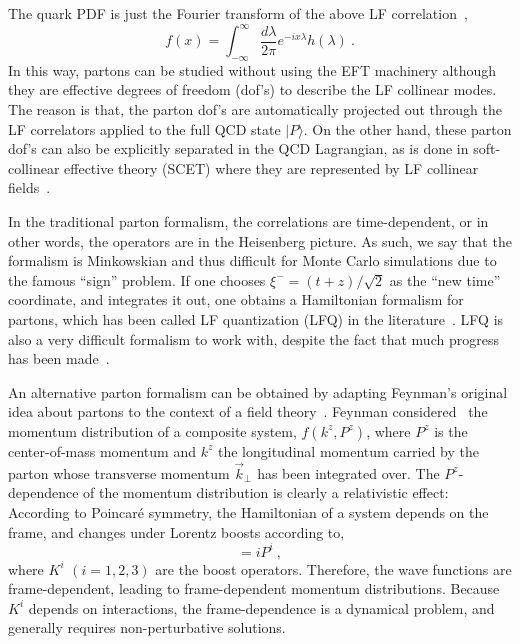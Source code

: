 \documentclass[preprint,12pt]{elsarticle}
\begin{document}
The quark PDF is just the Fourier transform of the above LF correlation~\cite{Collins:2011zzd},
\begin{equation}
     f(x) =\int^\infty_{-\infty} \frac{d\lambda}{2\pi} e^{-ix\lambda}h(\lambda)  \ .
\end{equation}
In this way, partons can be studied without using the EFT machinery although they are effective degrees of freedom (dof's)
to describe the LF collinear modes. The reason is that, the parton dof's are automatically projected out through the LF correlators applied to the full QCD state $|P\rangle$.
On the other hand, these parton dof's can also be explicitly separated in the QCD Lagrangian, as is done in soft-collinear effective theory (SCET) where they are represented by LF collinear 
fields~\cite{Bauer:2000yr,Bauer:2001ct,Bauer:2001yt}.

In the traditional parton formalism, the correlations are time-dependent, or in other words, the operators are in the Heisenberg picture. As such, we say that the formalism
is Minkowskian and thus difficult for Monte Carlo simulations due to
the famous ``sign'' problem. If one chooses
$\xi^- = (t+z)/\sqrt{2}$ as the ``new time'' coordinate,
and integrates it out, one obtains a Hamiltonian formalism
for partons, which has been called LF quantization (LFQ) in the
literature~\cite{Dirac:1949cp}. LFQ
is also a very difficult formalism to work with, despite the fact that
much progress has been made~\cite{Brodsky:1997de}.

An alternative parton formalism can be obtained
by adapting Feynman's original idea about partons
to the context of a field theory~\cite{Ji:2014gla,Ji:2020ect}.
Feynman considered~\cite{Feynman:1973xc} the momentum distribution of a composite system,
$f(k^z, P^z)$, where $P^z$ is the center-of-mass momentum and $k^z$ the longitudinal momentum carried by the parton whose
transverse momentum $\vec{k}_\perp$ has been integrated over.
The $P^z$-dependence of the momentum distribution is clearly
a relativistic effect: According to Poincar\'e symmetry,
the Hamiltonian of a system depends on the frame, and changes under Lorentz boosts
according to,
\begin{equation}
  [H, K^i] = i P^i\ ,
\end{equation}
where $K^i$ $(i = 1,2,3)$ are the boost operators. Therefore,
the wave functions are frame-dependent, leading to frame-dependent
momentum distributions. Because $K^i$ depends on interactions, the
frame-dependence is a dynamical problem, and generally requires
non-perturbative solutions.
\end{document}

